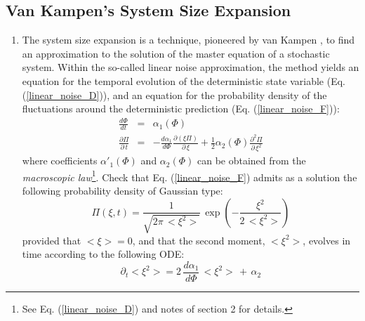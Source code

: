 \documentclass{article}
\begin{document}
\subsection*{Van Kampen's System Size Expansion}
\begin{enumerate}
\item The system size expansion is a technique, pioneered by van Kampen  \cite{vankampen92}, to find an approximation to the solution of the master equation of a stochastic system. Within the so-called linear noise approximation, the method yields an equation for the temporal evolution of the deterministic state variable (Eq. (\ref{linear_noise_D})), and an equation for the probability density of the fluctuations around the deterministic prediction (Eq. (\ref{linear_noise_F})):
\begin{eqnarray}
\label{linear_noise_D}
\frac{d\Phi}{dt}                & = &   \alpha_1(\Phi)  \\
\frac{\partial\Pi}{\partial\,t} & = & - \frac{d\alpha_1}{d\Phi}\frac{\partial(\xi\Pi)}{\partial\,\xi}+\frac{1}{2}\alpha_2(\Phi)\frac{\partial^2\Pi}{\partial\,\xi^2}
\label{linear_noise_F}
\end{eqnarray}
where coefficients $\alpha'_1(\Phi)$ and $\alpha_2(\Phi)$ can be obtained from the {\em macroscopic law}\footnote{See Eq. (\ref{linear_noise_D}) and notes of section 2 for details.}. Check that Eq. (\ref{linear_noise_F}) admits as a solution the following probability density of Gaussian type:
\begin{equation}
\label{Piofxit}
\Pi(\xi,t) = \frac{1}{\sqrt{2\pi\,<\xi^2>}}\,\exp \left(-\frac{\xi^2}{2\,<\xi^2>}\right)
\end{equation}
provided that $<\xi> = 0$, and that the second moment, $<\xi^2>$, evolves in time according to the following ODE:
\begin{equation}
\partial_t<\xi^2> = 2\,\frac{d\alpha_1}{d\Phi}\,<\xi^2> \,+\, \alpha_2 
\label{eq:xi}
\end{equation}


\end{enumerate}
\end{document}
